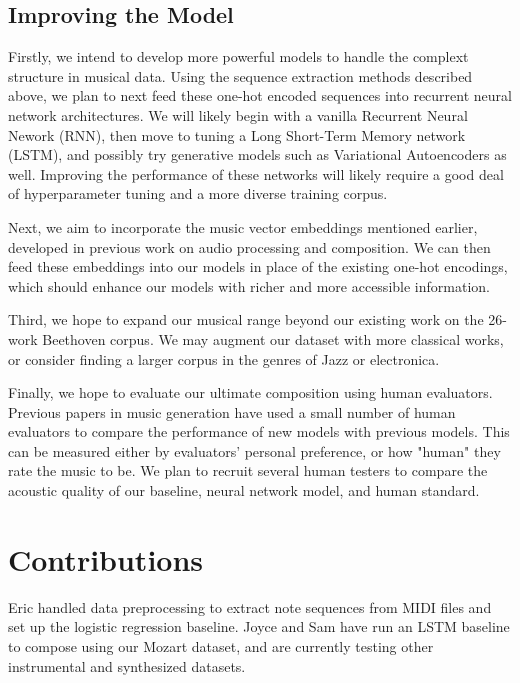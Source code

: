 \documentclass[twoside,twocolumn]{article}
\begin{document}
\subsection{Improving the Model}

Firstly, we intend to develop more powerful models to handle the complext structure in musical data. Using the sequence extraction methods described above, we plan to next feed these one-hot encoded sequences into recurrent neural network architectures. We will likely begin with a vanilla Recurrent Neural Nework (RNN), then move to tuning a Long Short-Term Memory network (LSTM), and possibly try generative models such as Variational Autoencoders as well. Improving the performance of these networks will likely require a good deal of hyperparameter tuning and a more diverse training corpus.

Next, we aim to incorporate the music vector embeddings mentioned earlier, developed in previous work on audio processing and composition. We can then feed these embeddings into our models in place of the existing one-hot encodings, which should enhance our models with richer and more accessible information.

Third, we hope to expand our musical range beyond our existing work on the 26-work Beethoven corpus. We may augment our dataset with more classical works, or consider finding a larger corpus in the genres of Jazz or electronica.

Finally, we hope to evaluate our ultimate composition using human evaluators. Previous papers in music generation have used a small number of human evaluators to compare the performance of new models with previous models. This can be measured either by evaluators' personal preference, or how "human" they rate the music to be. We plan to recruit several human testers to compare the acoustic quality of our baseline, neural network model, and human standard.



\section{Contributions}

Eric handled data preprocessing to extract note sequences from MIDI files and set up the logistic regression baseline. Joyce and Sam have run an LSTM baseline to compose using our Mozart dataset, and are currently testing other instrumental and synthesized datasets.






\end{document}
